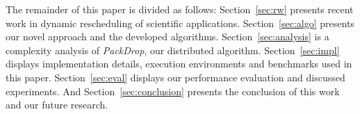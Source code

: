 The remainder of this paper is divided as follows:
Section~\ref{sec:rw} presents recent work in dynamic rescheduling of scientific applications. 
Section~\ref{sec:algo} presents our novel approach and the developed algorithms. 
Section~\ref{sec:analysis} is a complexity analysis of \textit{PackDrop}, our distributed algorithm. 
Section~\ref{sec:impl} displays implementation details, execution environments and benchmarks used in this paper. 
Section~\ref{sec:eval} displays our performance evaluation and discussed experiments. 
And Section~\ref{sec:conclusion} presents the conclusion of this work and our future research.

%
%
%
